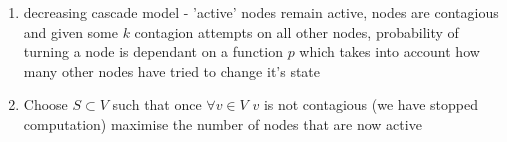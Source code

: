 \documentclass{article}
\begin{document}
\begin{enumerate}
  \item decreasing cascade model - 'active' nodes remain active, nodes are contagious and given some $k$ contagion attempts on all other nodes, probability of turning a node is dependant on a function $p$ which takes into account how many other nodes have tried to change it's state
  \item Choose $S \subset V$ such that once $\forall v \in V$ $v$ is not contagious (we have stopped computation) maximise the number of nodes that are now active
\end{enumerate}

{}

\end{document}
